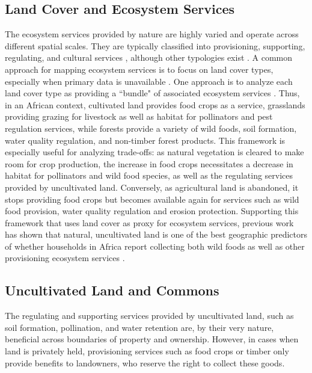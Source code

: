 \documentclass{article}
\begin{document}
\subsection{Land Cover and Ecosystem Services}
The ecosystem services provided by nature are highly varied and operate across different spatial scales.  They are typically classified into provisioning, supporting, regulating, and cultural services \cite{Martinez-Harms2012}, although other typologies exist \cite{Fisher2008}.  A common approach for mapping ecosystem services is to focus on land cover types, especially when primary data is unavailable \cite{Martinez-Harms2012}.  One approach is to analyze each land cover type as providing a ``bundle" of associated ecosystem services \cite{Raudsepp-Hearne2010}.  Thus, in an African context, cultivated land provides food crops as a service, grasslands providing grazing for livestock as well as habitat for pollinators and pest regulation services, while forests provide a variety of wild foods, soil formation, water quality regulation, and non-timber forest products.  This framework is especially useful for analyzing trade-offs: as natural vegetation is cleared to make room for crop production, the increase in food crops necessitates a decrease in habitat for pollinators and wild food species, as well as the regulating services provided by uncultivated land.  Conversely, as agricultural land is abandoned, it stops providing food crops but becomes available again for services such as wild food provision, water quality regulation and erosion protection.  Supporting this framework that uses land cover as proxy for ecosystem services, previous work has shown that natural, uncultivated land is one of the best geographic predictors of whether households in Africa report collecting both wild foods as well as other provisioning ecosystem services \cite{Cooper2018a}.

\subsection{Uncultivated Land and Commons}
The regulating and supporting services provided by uncultivated land, such as soil formation, pollination, and water retention are, by their very nature, beneficial across boundaries of property and ownership.  However, in cases when land is privately held, provisioning services such as food crops or timber only provide benefits to landowners, who reserve the right to collect these goods.  
\end{document}
